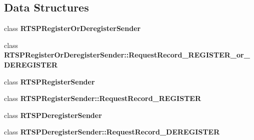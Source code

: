 \subsection*{Data Structures}
\begin{DoxyCompactItemize}
\item 
class {\bf R\+T\+S\+P\+Register\+Or\+Deregister\+Sender}
\item 
class {\bf R\+T\+S\+P\+Register\+Or\+Deregister\+Sender\+::\+Request\+Record\+\_\+\+R\+E\+G\+I\+S\+T\+E\+R\+\_\+or\+\_\+\+D\+E\+R\+E\+G\+I\+S\+T\+E\+R}
\item 
class {\bf R\+T\+S\+P\+Register\+Sender}
\item 
class {\bf R\+T\+S\+P\+Register\+Sender\+::\+Request\+Record\+\_\+\+R\+E\+G\+I\+S\+T\+E\+R}
\item 
class {\bf R\+T\+S\+P\+Deregister\+Sender}
\item 
class {\bf R\+T\+S\+P\+Deregister\+Sender\+::\+Request\+Record\+\_\+\+D\+E\+R\+E\+G\+I\+S\+T\+E\+R}
\end{DoxyCompactItemize}
